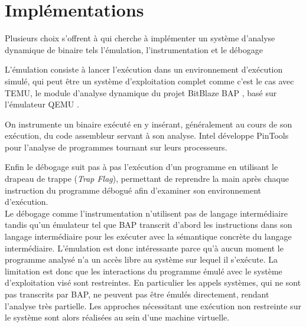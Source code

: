 \section{Implémentations}

Plusieurs choix s'offrent à qui cherche à implémenter un système d'analyse dynamique de binaire tels l'émulation, l'instrumentation et le débogage

L'émulation consiste à lancer l'exécution dans un environnement d'exécution simulé, qui peut être un système d'exploitation complet comme c'est le cas avec TEMU, le module d'analyse dynamique du projet BitBlaze BAP \cite{bitblaze08}, basé sur l'émulateur QEMU \cite{QEMU05}.

On instrumente un binaire exécuté en y insérant, généralement au cours de son exécution, du code assembleur servant à son analyse. Intel développe PinTools \cite{pintools} pour l'analyse de programmes tournant sur leurs processeurs.

Enfin le débogage suit pas à pas l'exécution d'un programme en utilisant le drapeau de trappe (\emph{Trap Flag}), permettant de reprendre la main après chaque instruction du programme débogué afin d'examiner son environnement d'exécution.
\\

Le débogage comme l'instrumentation n'utilisent pas de langage intermédiaire tandis qu'un émulateur tel que BAP transcrit d'abord les instructions dans son langage intermédiaire pour les exécuter avec la sémantique concrète du langage intermédiaire.
L'émulation est donc intéressante parce qu'à aucun moment le programme analysé n'a un accès libre au système sur lequel il s'exécute.
La limitation est donc que les interactions du programme émulé avec le système d'exploitation visé sont restreintes.
En particulier les appels systèmes, qui ne sont pas transcrits par BAP, ne peuvent pas être émulés directement, rendant l'analyse très partielle.
Les approches nécessitant une exécution non restreinte sur le système sont alors réalisées au sein d'une machine virtuelle.

